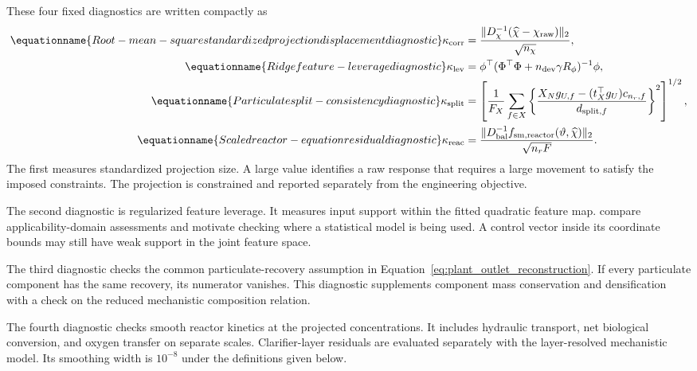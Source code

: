 These four fixed diagnostics are written compactly as
\begin{align}
\equationname{Root-mean-square standardized projection displacement diagnostic}
\kappa_{\rm corr}&=\frac{\|D_\chi^{-1}(\widehat\chi-\chi_{\rm raw})\|_2}{\sqrt{n_\chi}},\\
\equationname{Ridge feature-leverage diagnostic}
\kappa_{\rm lev}&=\phi^\top(\Phi^\top\Phi+n_{\rm dev}\gamma R_\phi)^{-1}\phi,\\
\equationname{Particulate split-consistency diagnostic}
\kappa_{\rm split}&=\left[\frac1{F_X}\sum_{f\in X}
\left\{\frac{X_Ng_{U,f}-(t_X^\top g_U)c_{n_r,f}}{d_{{\rm split},f}}\right\}^2\right]^{1/2},\\
\equationname{Scaled reactor-equation residual diagnostic}
\kappa_{\rm reac}&=\frac{\|D_{\rm bal}^{-1}f_{{\rm sm},\rm reactor}(\vartheta,\widehat\chi)\|_2}{\sqrt{n_rF}}.
\label{eq:plant_trust_diagnostics}
\end{align}
The first measures standardized projection size. A large value identifies a raw response that requires a large movement to satisfy the imposed constraints. The projection is constrained and reported separately from the engineering objective.

The second diagnostic is regularized feature leverage. It measures input support within the fitted quadratic feature map. \citet{Sahigara2012} compare applicability-domain assessments and motivate checking where a statistical model is being used. A control vector inside its coordinate bounds may still have weak support in the joint feature space.

The third diagnostic checks the common particulate-recovery assumption in Equation~\eqref{eq:plant_outlet_reconstruction}. If every particulate component has the same recovery, its numerator vanishes. This diagnostic supplements component mass conservation and densification with a check on the reduced mechanistic composition relation.

The fourth diagnostic checks smooth reactor kinetics at the projected concentrations. It includes hydraulic transport, net biological conversion, and oxygen transfer on separate scales. Clarifier-layer residuals are evaluated separately with the layer-resolved mechanistic model. Its smoothing width is $10^{-8}$ under the definitions given below.

